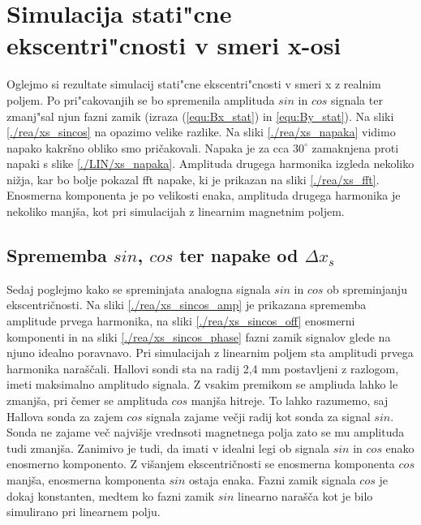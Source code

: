 \newpage
\section{Simulacija stati"cne ekscentri"cnosti v smeri x-osi}

Oglejmo si rezultate simulacij stati"cne ekscentri"cnosti v smeri x z  realnim poljem. Po pri"cakovanjih se bo spremenila amplituda $sin$ in $cos$ signala ter zmanj"sal njun fazni zamik (izraza (\ref{equ:Bx_stat}) in \ref{equ:By_stat}). Na sliki \ref{./rea/xs_sincos} na opazimo velike razlike. Na sliki \ref{./rea/xs_napaka} vidimo napako kakršno obliko smo pričakovali. Napaka je za cca $30^\circ$ zamaknjena proti napaki s slike \ref{./LIN/xs_napaka}. Amplituda drugega harmonika izgleda nekoliko nižja, kar bo bolje pokazal fft napake, ki je prikazan na sliki \ref{./rea/xs_fft}. Enosmerna komponenta je po velikosti enaka, amplituda drugega harmonika je nekoliko manjša, kot pri simulacijah z linearnim magnetnim poljem.




\newpage
\subsection{Sprememba $sin$, $cos$ ter napake od $\Delta x_s$}

Sedaj poglejmo kako se spreminjata analogna signala $sin$ in $cos$ ob spreminjanju ekscentričnosti. Na sliki \ref{./rea/xs_sincos_amp} je prikazana sprememba amplitude prvega harmonika, na sliki \ref{./rea/xs_sincos_off} enosmerni komponenti in na sliki \ref{./rea/xs_sincos_phase} fazni zamik signalov glede na njuno idealno poravnavo. Pri simulacijah z linearnim poljem sta amplitudi prvega harmonika naraščali. Hallovi sondi sta na radij 2,4 mm postavljeni z razlogom, imeti maksimalno amplitudo signala. Z vsakim premikom se ampliuda lahko le zmanjša, pri čemer se amplituda $cos$ manjša hitreje. To lahko razumemo, saj Hallova sonda za zajem $cos$ signala zajame večji radij kot sonda za signal $sin$. Sonda ne zajame več najvišje vrednsoti magnetnega polja zato  se mu amplituda tudi zmanjša. Zanimivo je tudi, da imati v idealni legi ob signala $sin$ in $cos$ enako enosmerno komponento. Z višanjem ekscentričnosti se enosmerna komponenta $cos$ manjša, enosmerna komponenta $sin$ ostaja enaka. Fazni zamik signala $cos$ je dokaj konstanten, medtem ko fazni zamik $sin$ linearno narašča kot je bilo simulirano pri linearnem polju.


